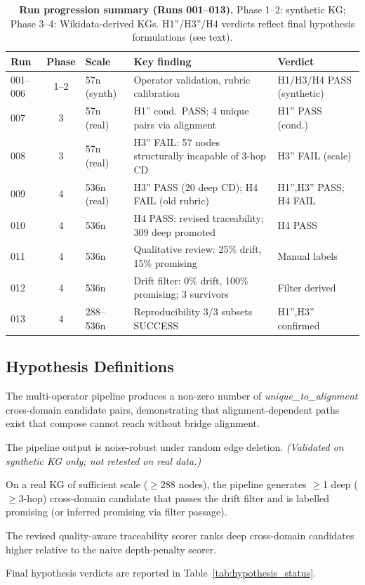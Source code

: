\begin{table}[h]
\caption{%
  \textbf{Run progression summary (Runs 001--013).}
  Phase 1--2: synthetic KG; Phase 3--4: Wikidata-derived KGs.
  H1''/H3''/H4 verdicts reflect final hypothesis formulations (see text).
}
\label{tab:run_summary}
\small
\begin{tabularx}{\linewidth}{lcllX}
\toprule
Run & Phase & Scale & Key finding & Verdict \\
\midrule
001--006 & 1--2 & 57n (synth) & Operator validation, rubric calibration & H1/H3/H4 PASS (synthetic) \\
007      & 3    & 57n (real)   & H1'' cond.\ PASS; 4 unique pairs via alignment & H1'' PASS (cond.) \\
008      & 3    & 57n (real)   & H3'' FAIL: 57 nodes structurally incapable of 3-hop CD & H3'' FAIL (scale) \\
009      & 4    & 536n (real)  & H3'' PASS (20 deep CD); H4 FAIL (old rubric) & H1'',H3'' PASS; H4 FAIL \\
010      & 4    & 536n         & H4 PASS: revised traceability; 309 deep promoted & H4 PASS \\
011      & 4    & 536n         & Qualitative review: 25\% drift, 15\% promising & Manual labels \\
012      & 4    & 536n         & Drift filter: 0\% drift, 100\% promising; 3 survivors & Filter derived \\
013      & 4    & 288--536n    & Reproducibility 3/3 subsets SUCCESS & H1'',H3'' confirmed \\
\bottomrule
\end{tabularx}
\end{table}

\subsection{Hypothesis Definitions}

\begin{description}[leftmargin=0pt]
\item[H1'']
The multi-operator pipeline produces a non-zero number of
\textit{unique\_to\_alignment} cross-domain candidate pairs, demonstrating that
alignment-dependent paths exist that compose cannot reach without bridge alignment.

\item[H2]
The pipeline output is noise-robust under random edge deletion.
\textit{(Validated on synthetic KG only; not retested on real data.)}

\item[H3'']
On a real KG of sufficient scale ($\geq$288 nodes), the pipeline generates
$\geq$1 deep ($\geq$3-hop) cross-domain candidate that passes the drift filter
and is labelled promising (or inferred promising via filter passage).

\item[H4]
The revised quality-aware traceability scorer ranks deep cross-domain candidates
higher relative to the naive depth-penalty scorer.

\end{description}

Final hypothesis verdicts are reported in Table~\ref{tab:hypothesis_status}.
